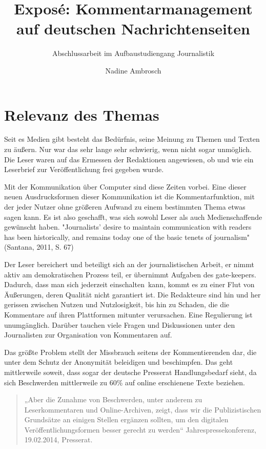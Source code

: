 \documentclass[12pt,titlepage=no,parskip=full]{scrartcl} %
\title{Exposé: Kommentarmanagement auf deutschen Nachrichtenseiten}
\subtitle{Abschlussarbeit im Aufbaustudiengang Journalistik}
\author{Nadine Ambrosch}
\begin{document}
\maketitle




\section{Relevanz des Themas}

Seit es Medien gibt besteht das Bedürfnis, seine Meinung zu Themen und Texten zu
äußern. Nur war das sehr lange sehr schwierig, wenn nicht sogar unmöglich. Die
Leser waren auf das Ermessen der Redaktionen angewiesen, ob und wie ein
Leserbrief zur Veröffentlichung frei gegeben wurde. 

Mit der Kommunikation über
Computer sind diese Zeiten vorbei. Eine dieser neuen Ausdrucksformen dieser
Kommunikation ist die Kommentarfunktion, mit der jeder Nutzer ohne größeren
Aufwand zu einem bestimmten Thema etwas sagen kann. Es ist also geschafft, was
sich sowohl Leser als auch Medienschaffende gewünscht haben. "Journalists’ desire to 
maintain communication with readers has
been historically, and remains today one of the basic tenets of journalism" (Santana, 2011, S. 67) 

Der Leser bereichert und beteiligt sich an der journalistischen Arbeit, er nimmt
aktiv am demokratischen Prozess teil, er übernimmt Aufgaben des gate-keepers.
Dadurch, dass man sich jederzeit \glqq einschalten\grqq\ kann, kommt es zu
einer Flut von Äußerungen, deren Qualität nicht garantiert ist. Die Redakteure
sind hin und her gerissen zwischen Nutzen und Nutzlosigkeit, bis hin zu Schaden,
die die Kommentare auf ihren Plattformen mitunter verursachen. Eine Regulierung
ist unumgänglich. Darüber tauchen viele Fragen und Diskussionen unter den
Journalisten zur Organisation von Kommentaren auf.

Das größte Problem stellt der Missbrauch seitens der Kommentierenden dar, die unter dem Schutz
der Anonymität beleidigen und beschimpfen. Das geht mittlerweile soweit, dass
sogar der deutsche Presserat Handlungsbedarf sieht, da sich Beschwerden
mittlerweile zu 60\% auf online erschienene Texte beziehen.  

\begin{quote}
„Aber die Zunahme
von Beschwerden, unter anderem zu Leserkommentaren und Online-Archiven, zeigt,
dass wir die Publizistischen Grundsätze an einigen Stellen ergänzen sollten, um
den digitalen Ver\-öffentlichungs\-for\-men besser gerecht zu werden“
Jahrespressekonferenz, 19.02.2014, Presserat. 
\end{quote}
\end{document}
